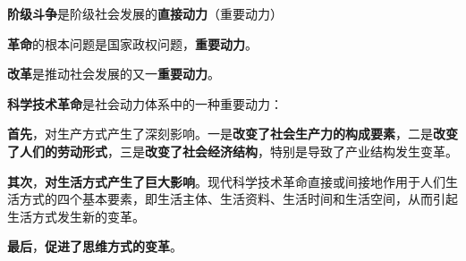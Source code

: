 {\textbf{阶级斗争}}是阶级社会发展的\textbf{{直接动力}}（重要动力）

{\textbf{革命}}的根本问题是国家政权问题，\textbf{{重要动力}}。

{\textbf{改革}}是推动社会发展的又一\textbf{{重要动力}}。

{\textbf{科学技术革命}}是社会动力体系中的一种重要动力：

\textbf{首先}，对生产方式产生了深刻影响。一是\textbf{{改变了社会生产力的构成要素}}，二是\textbf{改变了人们的劳动形式}，三是{\textbf{改变了社会经济结构}}，特别是导致了产业结构发生变革。

\textbf{其次}，{\textbf{对生活方式产生了巨大影响}}。现代科学技术革命直接或间接地作用于人们生活方式的四个基本要素，即生活主体、生活资料、生活时间和生活空间，从而引起生活方式发生新的变革。

\textbf{最后}，{\textbf{促进了思维方式的变革}}。
